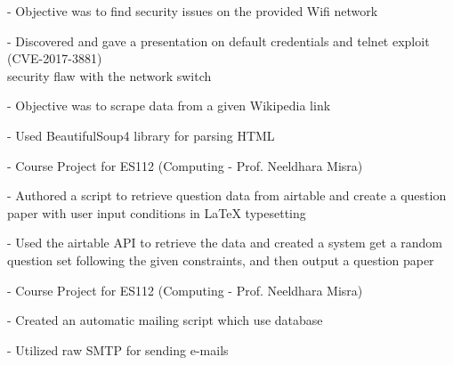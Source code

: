 \begin{bulletlist}
\begin{bulletlist}
		\item[-] Objective was to find security issues on the provided Wifi network
		\item[-] Discovered and gave a presentation on default credentials and telnet exploit (CVE-2017-3881)\\ security flaw with the network switch
	\end{bulletlist}
	\item {}
	\begin{bulletlist}
		\item[-] Objective was to scrape data from a given Wikipedia link
		\item[-] Used BeautifulSoup4 library for parsing HTML
		\item[-] Course Project for ES112 (Computing - Prof. Neeldhara Misra)
	\end{bulletlist}
	\item {}
	\begin{bulletlist}
		\item[-] Authored a script to retrieve question data from airtable and create a question paper with user input conditions in LaTeX typesetting
		\item[-] Used the airtable API to retrieve the data and created a system get a random question set following the given constraints, and then output a question paper
		\item[-] Course Project for ES112 (Computing - Prof. Neeldhara Misra)
	\end{bulletlist}
	\item {}
	\begin{bulletlist}
		\item[-] Created an automatic mailing script which use database
		\item[-] Utilized raw SMTP for sending e-mails
	\end{bulletlist}
\end{bulletlist}